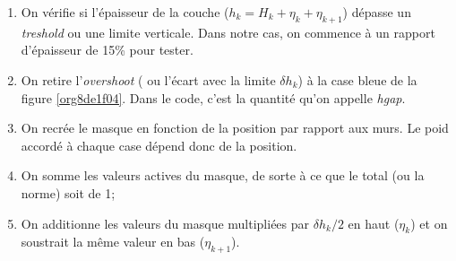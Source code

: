 \documentclass[10pt]{report}
\numberwithin{equation}{section}
\begin{document}
\begin{enumerate}
\item On vérifie si l'épaisseur de la couche (\(h_k = H_k + \eta_k + \eta_{k+1}\)) dépasse un \emph{treshold} ou une limite verticale.
Dans notre cas, on commence à un rapport d'épaisseur de 15\% pour tester.
\item On retire l'\emph{overshoot} ( ou l'écart avec la limite \(\delta h_k\)) à la case bleue de la figure \ref{org8de1f04}.
Dans le code, c'est la quantité qu'on appelle \emph{hgap}.
\item On recrée le masque en fonction de la position par rapport aux murs.
Le poid accordé à chaque case dépend donc de la position.
\item On somme les valeurs actives du masque, de sorte à ce que le total (ou la norme) soit de 1;
\item On additionne les valeurs du masque multipliées par \(\delta h_k/2\) en haut (\(\eta_k\)) et on soustrait la même valeur en bas (\(\eta_{k+1}\)).
\end{enumerate}
\end{document}
